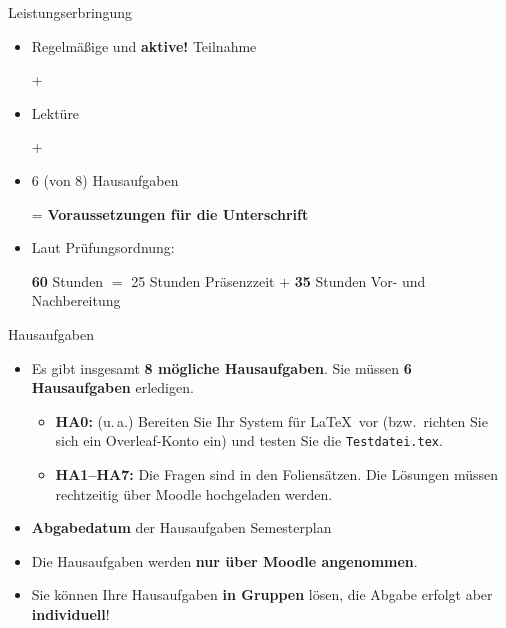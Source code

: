 \begin{frame}{Leistungserbringung}

	\begin{itemize}
		\item Regelmäßige und \textbf{aktive!} Teilnahme
		\item[+]
		
		\item Lektüre
		\item[+]
				
		\item 6 (von 8) Hausaufgaben 
		
		\item[]
		\item[=] \textbf{Voraussetzungen für die Unterschrift}
			
	\end{itemize}
	
	\begin{itemize}
		\item Laut Prüfungsordnung:
		
		\textbf{60} Stunden $=$ 25 Stunden Präsenzzeit $+$ \textbf{35} Stunden Vor- und Nachbereitung
	\end{itemize}	
\end{frame}


\begin{frame}{Hausaufgaben}

\begin{itemize}

	\item Es gibt insgesamt \textbf{8 mögliche Hausaufgaben}. Sie müssen \textbf{6 Hausaufgaben} erledigen.

	\begin{itemize}
		\item \textbf{HA0:} (u.\,a.) Bereiten Sie Ihr System für \LaTeX\ vor (bzw.\ richten Sie sich ein Overleaf-Konto ein) und testen Sie die \texttt{Testdatei.tex}.
		
		\item \textbf{HA1--HA7:} Die Fragen sind in den Foliensätzen. Die Lösungen müssen rechtzeitig über Moodle hochgeladen werden.
	\end{itemize}

	\item \textbf{Abgabedatum} der Hausaufgaben \ras Semesterplan
	
	\item Die Hausaufgaben werden \textbf{nur über Moodle angenommen}.
	
	\item Sie können Ihre Hausaufgaben \textbf{in Gruppen} lösen, die Abgabe erfolgt aber \textbf{individuell}!

\end{itemize}

\end{frame}


